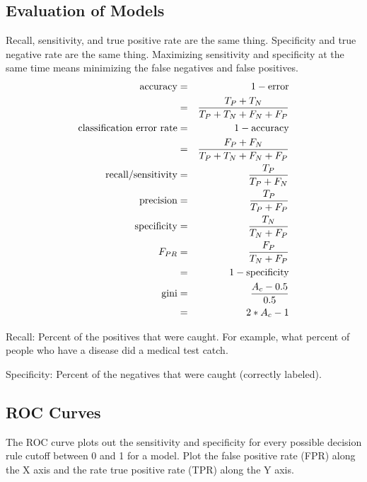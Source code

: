 	\subsection{Evaluation of Models}
Recall, sensitivity, and true positive rate are the same thing.  Specificity and true negative rate are the same thing.  Maximizing sensitivity and specificity at the same time means minimizing the false negatives and false positives.
	\begin{eqnarray}
		\textrm{accuracy} 						& = & 1 - \textrm{error} 						\\
												& = & \frac{T_P + T_N}{T_P + T_N + F_N + F_P} 	\\
		\textrm{classification error  rate}		& = & 1 - \textrm{accuracy} 					\\
												& = & \frac{F_P + F_N}{T_P + T_N + F_N + F_P} 	\\
		\textrm{recall/sensitivity}				& = & \frac{T_P}{T_P + F_N} 					\\
		\textrm{precision} 						& = & \frac{T_P}{T_P + F_P} 					\\
		\textrm{specificity} 					& = & \frac{T_N}{T_N + F_P}						\\
		\mbox{$F_{PR}$}						& = & \frac{F_P}{T_N + F_P}						\\
												& = & 1 - \textrm{specificity}					\\
		\textrm{gini}							& = & \frac{A_c - 0.5}{0.5}						\\
												& = & 2*A_c - 1
	\end{eqnarray}
	\begin{mathwhere}[0.4in]
	\end{mathwhere}

Recall: Percent of the positives that were caught.  For example, what percent of people who have a disease did a medical test catch.

Specificity: Percent of the negatives that were caught (correctly labeled).

	\subsection{ROC Curves}
The ROC curve plots out the sensitivity and specificity for every possible decision rule cutoff between 0 and 1 for a model.
Plot the false positive rate (FPR) along the X axis and the rate true positive rate (TPR) along the Y axis.

